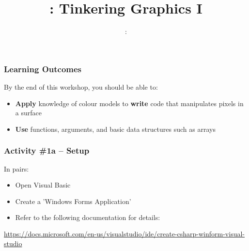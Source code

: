 \usepackage{../../beamerthemeFalmouthGamesAcademy}
\usepackage{multimedia}
\graphicspath{ {../../} }


\usepackage[normalem]{ulem}
\usepackage{wasysym}

\usepackage{pdfpages}

\usetikzlibrary{arrows,automata}







\title{\sessionnumber: Tinkering Graphics I}
\subtitle{\modulecode: \moduletitle}

\frame{\titlepage} 

\begin{frame}
	\frametitle{Learning Outcomes}
	By the end of this workshop, you should be able to:	
	\begin{itemize}
		\item \textbf{Apply} knowledge of colour models to \textbf{write} code that manipulates pixels in a surface
		\item \textbf{Use} functions, arguments, and basic data structures such as arrays
	\end{itemize}
\end{frame}

\begin{frame}
	\frametitle{Activity \#1a -- Setup}
	
	In pairs:
	
	\vspace{2em}
	
	\begin{itemize}		
		\item Open Visual Basic 
		\item Create a 'Windows Forms Application'
		\item Refer to the following documentation for details:
	\end{itemize}
\scriptsize \url{https://docs.microsoft.com/en-us/visualstudio/ide/create-csharp-winform-visual-studio}
\end{frame}

